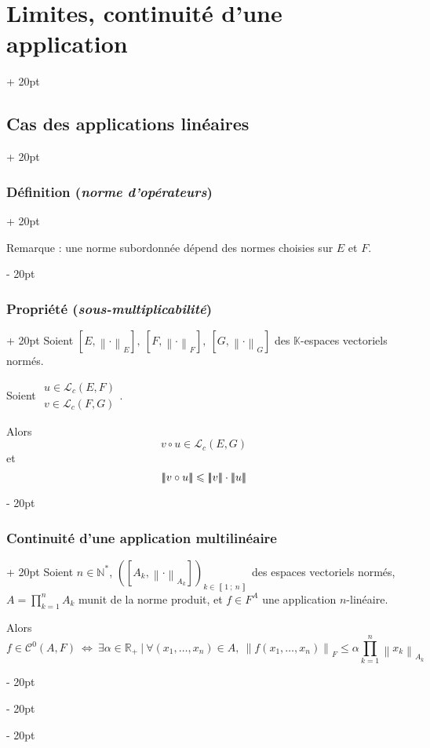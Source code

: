 \documentclass[a4paper, 12pt, twoside]{article}
\newcommand{\N}{\mathbb{N}} %
\newcommand{\R}{\mathbb{R}} %
\newcommand{\K}{\mathbb K}
\newcommand{\nset}[2]{\left\llbracket #1\ ;\ #2 \right\rrbracket}
\newcommand{\lr}[1]{\left( #1 \right)}
\newcommand{\lrb}[1]{\left[ #1 \right]}
\newcommand{\norm}[1]{\left\lVert #1 \right\rVert}
\newcommand{\nnorm}[2][-2pt]{{\left\lvert \kern#1 \left\lvert \kern#1 \left\lvert #2 \right\rvert \kern#1 \right\rvert \kern#1 \right\rvert}}
\newcommand{\ssi}{\ \Leftrightarrow \ }
\renewcommand{\le}{\leqslant}
\newcommand{\ind}[1][20pt]{\advance\leftskip + #1}
\newcommand{\deind}[1][20pt]{\advance\leftskip - #1}
\newenvironment{indt}[2][20pt]{#2 \par \ind[#1]}{\par \deind} %
\begin{document}
\begin{indt}{\section{Limites, continuité d'une application}}
\begin{indt}{\subsection{Cas des applications linéaires}}
\begin{indt}{\subsubsection{Définition (\textit{norme d'opérateurs})}}
                \vspace{6pt}
                
                Remarque : une norme subordonnée dépend des normes choisies sur $E$ et $F$.
            \end{indt}

            \vspace{12pt}
            
            \begin{indt}{\subsubsection{Propriété (\textit{sous-multiplicabilité})}}
                Soient $[E, \norm \cdot _E],\ [F, \norm \cdot _F],\ [G, \norm \cdot _G]$ des $\K$-espaces vectoriels normés.

                Soient
                $
                    \begin{array}{|l}
                        u \in \mathcal L_c(E, F)
                        \\
                        v \in \mathcal L_c(F, G)
                    \end{array}
                $.

                \vspace{6pt}
                
                Alors
                \[
                    v \circ u \in \mathcal L_c(E, G)
                \]
                et
                \[
                    \nnorm{v \circ u} \le \nnorm{v} \cdot \nnorm u
                \]
            \end{indt}
            
            \vspace{12pt}
            
            \begin{indt}{\subsubsection{Continuité d'une application multilinéaire}}
                Soient $n \in \N^*$, $\lr{\lrb{A_k, \norm \cdot _{A_k}}}_{k \in \nset 1 n}$ des espaces vectoriels normés, $\displaystyle A = \prod_{k = 1}^n A_k$ munit de la norme produit, et $f \in F^A$ une application $n$-linéaire.

                Alors
                \[
                    f \in \mathcal C^0(A, F)
                    \ssi
                    \exists \alpha \in \R_+\ |\
                    \forall (x_1, \ldots, x_n) \in A,\
                    \norm{f(x_1, \ldots, x_n)}_F \le \alpha \prod_{k = 1}^n \norm{x_k}_{A_k}
                \]
            \end{indt}
        \end{indt}
    \end{indt}
\end{document}
